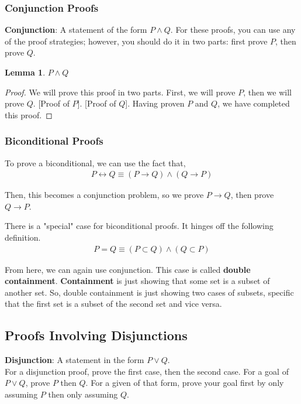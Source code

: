 \documentclass{article}
\newtheorem{lemma}[theorem]{Lemma}
\begin{document}
\subsubsection{Conjunction Proofs}
\textbf{Conjunction}: A statement of the form $P \land Q$.
For these proofs, you can use any of the proof strategies; however, you should do it in two parts: first prove $P$, then prove $Q$.

\begin{lemma}
    $P \land Q$
\end{lemma}
\begin{proof}
    We will prove this proof in two parts. First, we will prove $P$, then we will prove $Q$.
    [Proof of $P$].
    [Proof of $Q$].
    Having proven $P$ and $Q$, we have completed this proof.
\end{proof}

\subsubsection{Biconditional Proofs}
To prove a biconditional, we can use the fact that,
\begin{eqnarray*}
    P \leftrightarrow Q \equiv (P \rightarrow Q) \land (Q \rightarrow P)
\end{eqnarray*}

\noindent Then, this becomes a conjunction problem, so we prove $P \rightarrow Q$, then prove $Q \rightarrow P$.

\noindent There is a "special" case for biconditional proofs. It hinges off the following definition.
\begin{eqnarray*}
    P = Q \equiv (P \subset Q) \land (Q \subset P)
\end{eqnarray*}

\noindent From here, we can again use conjunction. This case is called \textbf{double containment}. \textbf{Containment} is just showing that
some set is a subset of another set. So, double containment is just showing two cases of subsets, specific that the first set is a subset of the
second set and vice versa.

\subsection{Proofs Involving Disjunctions}
\textbf{Disjunction}: A statement in the form $P \lor Q$. \\

\noindent For a disjunction proof, prove the first case, then the second case. For a goal of $P \lor Q$, prove $P$ then $Q$. For a given of that form, prove your goal first by only assuming $P$ then only
assuming $Q$.
\end{document}
